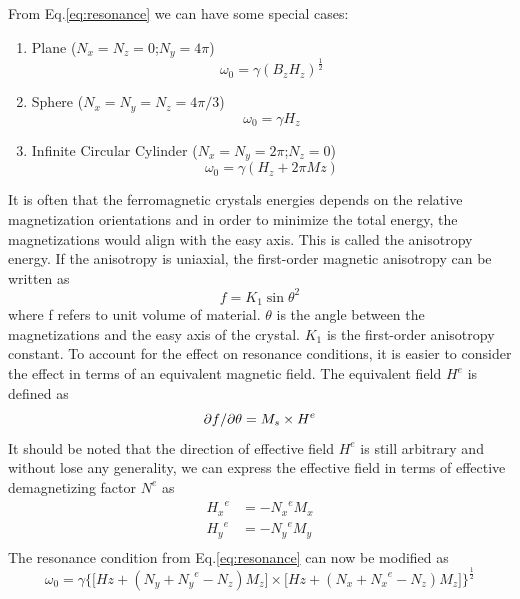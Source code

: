 From Eq.\ref{eq:resonance} we can have some special cases:
\begin{enumerate}
  \item Plane ($N_x = N_z = 0$;$N_y = 4 \pi$)
  \begin{equation}
      \omega_0 = \gamma (B_z H_z)^\frac{1}{2}
  \end{equation}
  \item Sphere ($N_x = N_y = N_z = 4\pi/3$)
  \begin{equation}
      \omega_0 = \gamma H_z
  \end{equation}
  \item Infinite Circular Cylinder ($N_x = N_y = 2\pi$;$N_z = 0 $)
  \begin{equation}
      \omega_0 = \gamma (H_z+2\pi Mz)
  \end{equation}
\end{enumerate}
It is often that the ferromagnetic crystals energies depends on the relative magnetization orientations and in order to minimize the total energy, the magnetizations would align with the easy axis. This is called the anisotropy energy. If the anisotropy is uniaxial, the first-order magnetic anisotropy can be written as 
\begin{equation}
    f = K_1 {\sin{\theta}}^2
\end{equation}
where f refers to unit volume of material. $\theta$ is the angle between the magnetizations and the easy axis of the crystal. $K_1$ is the first-order anisotropy constant. To account for the effect on resonance conditions, it is easier to consider the effect in terms of an equivalent magnetic field. The equivalent field $H^e$ is defined as
\begin{equation}
    \partial f \char`\/ \partial \theta = M_s \times H^e
\end{equation}
It should be noted that the direction of effective field $H^e$ is still arbitrary and without lose any generality, we can express the effective field in terms of effective demagnetizing factor $N^e$ as
\begin{equation}
    \begin{aligned}
        {H_x}^e &= - {N_x}^e M_x \\
        {H_y}^e &= - {N_y}^e M_y \\
    \end{aligned}
\end{equation}
The resonance condition from Eq.\ref{eq:resonance} can now be modified as 
\begin{equation}
    \label{eq:resonanceKu}
    \omega_0 = \gamma \big\{ \big[Hz+(N_y + {N_y}^e - N_z)M_z] \times \big[Hz+(N_x + {N_x}^e - N_z)M_z]          \big\}^\frac{1}{2}
\end{equation}





